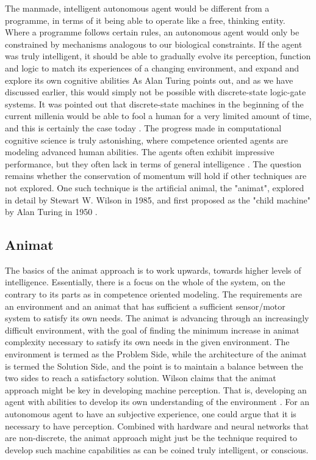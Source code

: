 The manmade, intelligent autonomous agent would be different from a programme, in terms of it being able to operate like a free, thinking entity.
Where a programme follows certain rules, an autonomous agent would only be constrained by mechanisms analogous to our biological constraints.
If the agent was truly intelligent, it should be able to gradually evolve its perception, function and logic to match its experiences of a changing environment, and expand and explore its own cognitive abilities \cite{franklin_graesser_agents}
As Alan Turing points out, and as we have discussed earlier, this would simply not be possible with discrete-state logic-gate systems.
It was pointed out that discrete-state machines in the beginning of the current millenia would be able to fool a human for a very limited amount of time,
and this is certainly the case today \cite{computing_machine_intelligence_turing}.
The progress made in computational cognitive science is truly astonishing, where competence oriented agents are modeling advanced human abilities.
The agents often exhibit impressive performance, but they often lack in terms of general intelligence \cite{wilson_animat}.
The question remains whether the conservation of momentum will hold if other techniques are not explored.
One such technique is the artificial animal, the "animat", explored in detail by Stewart W. Wilson in 1985, and first proposed as the "child machine" by Alan Turing in 1950 \cite{wilson_animat} \cite{turing_computing_machine_intelligence}.

\subsection{Animat}
The basics of the animat approach is to work upwards, towards higher levels of intelligence.
Essentially, there is a focus on the whole of the system, on the contrary to its parts as in competence oriented modeling.
The requirements are an environment and an animat that has sufficient a sufficient sensor/motor system to satisfy its own needs.
The animat is advancing through an increasingly difficult environment, with the goal of finding the minimum increase in animat complexity necessary to satisfy its own needs in the given environment.
The environment is termed as the Problem Side, while the architecture of the animat is termed the Solution Side, and the point is to maintain a balance between the two sides to reach a satisfactory solution.
Wilson claims that the animat approach might be key in developing machine perception.
That is, developing an agent with abilities to develop its own understanding of the environment \cite{wilson_animat}.
For an autonomous agent to have an subjective experience, one could argue that it is necessary to have perception.
Combined with hardware and neural networks that are non-discrete, the animat approach might just be the technique required to develop such machine capabilities as can be coined truly intelligent, or conscious.




